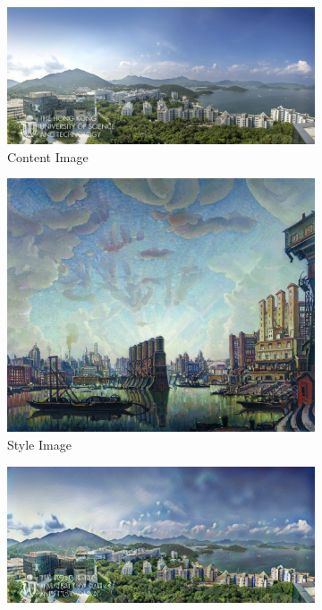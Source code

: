 \documentclass{article}
\begin{document}
\begin{figure}[ht]
    \centering
    \begin{minipage}{\textwidth}
        \centering
        \begin{subfigure}{0.25\textwidth}
            \includegraphics[width=\textwidth]{./data_set/HKUST/1.jpg}
            \caption{Content Image}
        \end{subfigure}
        \hfill %
        \begin{subfigure}{0.25\textwidth}
            \includegraphics[width=\textwidth]{./wikiart/Symbolism/konstantin-bogaevsky_port-of-imaginary-city-1932.jpg}
            \caption{Style Image}
        \end{subfigure}
        \hfill %
        \begin{subfigure}{0.25\textwidth}
            \includegraphics[width=\textwidth]{./part1_inference/output_1_konstantin-bogaevsky_port-of-imaginary-city-1932.jpg}

\end{subfigure}
\end{minipage}
\end{figure}
\end{document}

